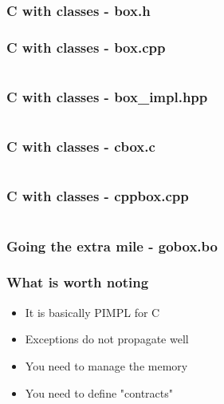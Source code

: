 \begin{frame}[c]
  \frametitle{C with classes - box.h}
\end{frame}

\begin{frame}[c]
  \frametitle{C with classes - box.cpp}
  \inputminted[firstline=6,lastline=9]{c}{code/box/box.cpp}
\end{frame}

\begin{frame}[c]
  \frametitle{C with classes - box\_impl.hpp}
  \inputminted[fontsize=\scriptsize,firstline=8,lastline=19]{c}{code/box/box_impl.hpp}
\end{frame}

\begin{frame}[c]
  \frametitle{C with classes - cbox.c}
  \inputminted[fontsize=\scriptsize,firstline=7,lastline=17]{c}{code/box/cbox.c}
\end{frame}

\begin{frame}[c]
  \frametitle{C with classes - cppbox.cpp}
  \inputminted[firstline=5,lastline=10]{c}{code/box/cppbox.cpp}
\end{frame}

\begin{frame}[c]
  \frametitle{Going the extra mile - gobox.bo}
\end{frame}

\begin{frame}[c]
  \frametitle{What is worth noting}\pause{}
  \begin{itemize}
    \item{It is basically PIMPL for C}\pause{}
    \item{Exceptions do not propagate well}\pause{}
    \item{You need to manage the memory}\pause{}
    \item{You need to define "contracts"}
  \end{itemize}
\end{frame}
